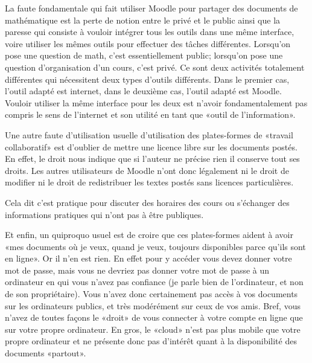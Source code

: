 La faute fondamentale qui fait utiliser Moodle pour partager des documents de mathématique est la perte de notion entre le privé et le public ainsi que la paresse qui consiste à vouloir intégrer tous les outils dans une même interface, voire utiliser les mêmes outils pour effectuer des tâches différentes. Lorsqu'on pose une question de math, c'est essentiellement public; lorsqu'on pose une question d'organisation d'un cours, c'est privé. Ce sont deux activités totalement différentes qui nécessitent deux types d'outils différents. Dans le premier cas, l'outil adapté est internet, dans le deuxième cas, l'outil adapté est Moodle. Vouloir utiliser la même interface pour les deux est n'avoir fondamentalement pas compris le sens de l'internet et son utilité en tant que «outil de l'information».

Une autre faute d'utilisation usuelle d'utilisation des plates-formes de «travail collaboratif» est d'oublier de mettre une licence libre sur les documents postés. En effet, le droit nous indique que si l'auteur ne précise rien il conserve tout ses droits. Les autres utilisateurs de Moodle n'ont donc légalement ni le droit de modifier ni le droit de redistribuer les textes postés sans licences particulières.

{\tiny Cela dit c'est pratique pour discuter des horaires des cours ou s'échanger des informations pratiques qui n'ont pas à être publiques.}

Et enfin, un quiproquo usuel est de croire que ces plates-formes aident à avoir «mes documents où je veux, quand je veux, toujours disponibles parce qu'ils sont en ligne». Or il n'en est rien. En effet pour y accéder vous devez donner votre mot de passe, mais vous ne devriez pas donner votre mot de passe à un ordinateur en qui vous n'avez pas confiance (je parle bien de l'ordinateur, et non de son propriétaire). Vous n'avez donc certainement pas accès à vos documents sur les ordinateurs publics, et très modérément sur ceux de vos amis. Bref, vous n'avez de toutes façons le «droit» de vous connecter à votre compte en ligne que sur votre propre ordinateur. En gros, le «cloud» n'est pas plus mobile que votre propre ordinateur et ne présente donc pas d'intérêt quant à la disponibilité des documents «partout».


